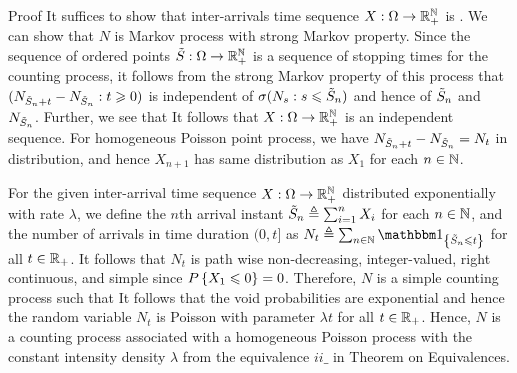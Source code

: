 \documentclass[12pt,aspectratio=169]{beamer}
\begin{document}
\begin{frame}
\begin{block}{Proof}
It suffices to show that inter-arrivals time sequence $X:\Omega\to\mathbb{R}_+^{\mathbb{N}}$ is \iid.  
We can show that $N$ is Markov process with strong Markov property. 
Since the sequence of ordered points $\tilde{S}:\Omega\to\mathbb{R}_+^{\mathbb{N}}$ is a sequence of stopping times for the counting process, 
it follows from the strong Markov property of this process that $(N_{\tilde{S}_n+t} - N_{\tilde{S}_n}: t \geqslant 0)$ is independent of $\sigma(N_s: s \leqslant \tilde{S}_n)$ and hence of $\tilde{S}_n$ and $N_{\tilde{S}_n}$. 
Further, we see that
It follows that $X:\Omega\to\mathbb{R}_+^{\mathbb{N}}$ is an independent sequence. 
For homogeneous Poisson point process, we have $N_{\tilde{S}_n+t}-N_{\tilde{S}_n} = N_t$ in distribution, 
and hence $X_{n+1}$ has same distribution as $X_1$ for each $n \in \mathbb{N}$. 
\end{block}
\end{frame}

\begin{frame}
\begin{Proof}
For the given \iid inter-arrival time sequence $X:\Omega\to\mathbb{R}_+^{\mathbb{N}}$ distributed exponentially with rate $\lambda$, we define the $n$th arrival instant $\tilde{S}_n \triangleq \sum_{i=1}^nX_i$ for each $n \in \mathbb{N}$, and the number of arrivals in time duration $(0,t]$ as $N_t\triangleq \sum_{n\in\N}\SetIn{\tS_n\le t}$ for all $t\in \mathbb{R}_+$. 
It follows that $N_t$ is path wise non-decreasing, integer-valued, right continuous, and simple since $P\left\{X_1 \leqslant 0\right\} = 0$. 
Therefore, $N$ is a simple counting process such that 
It follows that the void probabilities are exponential and hence the random variable $N_t$ is Poisson with parameter $\lambda t$ for all $t \in \mathbb{R}_+$. 
Hence, $N$ is a counting process associated with a homogeneous Poisson process with the constant intensity density $\lambda$ from the equivalence $ii\_$ in Theorem on Equivalences. 
\end{Proof}
\end{frame}
\end{document}
